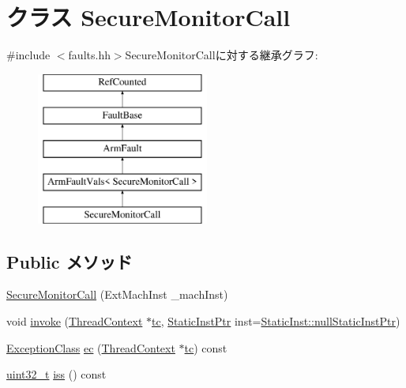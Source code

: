 \hypertarget{classArmISA_1_1SecureMonitorCall}{
\section{クラス SecureMonitorCall}
\label{classArmISA_1_1SecureMonitorCall}
}


{\ttfamily \#include $<$faults.hh$>$}SecureMonitorCallに対する継承グラフ:\begin{figure}[H]
\begin{center}
\leavevmode
\includegraphics[height=5cm]{classArmISA_1_1SecureMonitorCall}
\end{center}
\end{figure}
\subsection*{Public メソッド}
\begin{DoxyCompactItemize}
\item 
\hyperlink{classArmISA_1_1SecureMonitorCall_aab4fff0747965a2d46f019a6acb71460}{SecureMonitorCall} (ExtMachInst \_\-machInst)
\item 
void \hyperlink{classArmISA_1_1SecureMonitorCall_a2bd783b42262278d41157d428e1f8d6f}{invoke} (\hyperlink{classThreadContext}{ThreadContext} $\ast$\hyperlink{namespaceArmISA_a5aff829af55e65b802d83dfcef4e9dd0}{tc}, \hyperlink{classRefCountingPtr}{StaticInstPtr} inst=\hyperlink{classStaticInst_aa793d9793af735f09096369fb17567b6}{StaticInst::nullStaticInstPtr})
\item 
\hyperlink{namespaceArmISA_a04034d12009cf36227f4d2abff3331a2}{ExceptionClass} \hyperlink{classArmISA_1_1SecureMonitorCall_aefab73b22a74d7c48b8a23230906d7cd}{ec} (\hyperlink{classThreadContext}{ThreadContext} $\ast$\hyperlink{namespaceArmISA_a5aff829af55e65b802d83dfcef4e9dd0}{tc}) const 
\item 
\hyperlink{Type_8hh_a435d1572bf3f880d55459d9805097f62}{uint32\_\-t} \hyperlink{classArmISA_1_1SecureMonitorCall_a54f4d33ac162a95fd5b3830cf7fab8ff}{iss} () const 
\end{DoxyCompactItemize}


